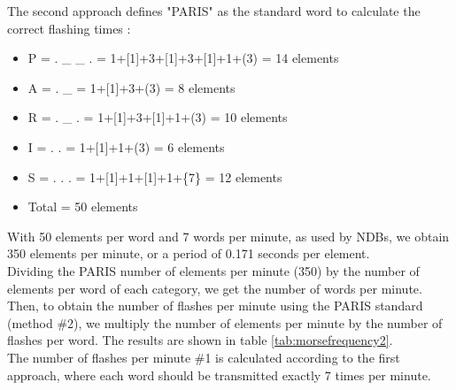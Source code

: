 The second approach defines "PARIS" as the standard word to calculate the correct flashing times \citep{Morsh1948}:
\begin{itemize}
  \item[] P = . \_ \_ . = 1+[1]+3+[1]+3+[1]+1+(3) = 14 elements             
  \item[] A = . \_ = 1+[1]+3+(3) = 8 elements              
  \item[] R = . \_ . = 1+[1]+3+[1]+1+(3) = 10 elements			  
  \item[] I = . . = 1+[1]+1+(3) = 6 elements			  
  \item[] S = . . . = 1+[1]+1+[1]+1+\{7\} = 12 elements	  
  \item[] Total = 50 elements		 
\end{itemize}
With 50 elements per word and 7 words per minute, as used by NDBs, we obtain 350 elements per minute, or a period of 0.171 seconds per element.\\
Dividing the PARIS number of elements per minute (350) by the number of elements per word of each category, we get the number of words per minute. Then, to obtain the number of flashes per minute using the PARIS standard (method \#2), we multiply the number of elements per minute by the number of flashes per word. The results are shown in table \ref{tab:morsefrequency2}.\\
The number of flashes per minute \#1 is calculated according to the first approach, where each word should be transmitted exactly 7 times per minute.
